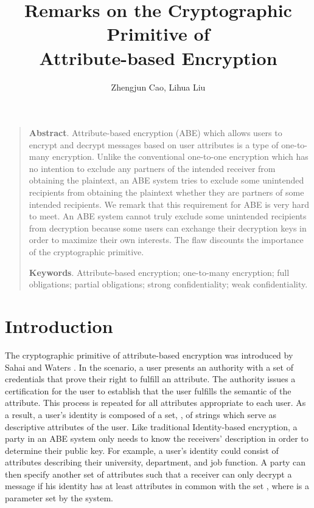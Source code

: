 \documentclass[11pt]{article}
\begin{document}
 \title{Remarks on the Cryptographic Primitive of\\ Attribute-based Encryption }

 \author{Zhengjun Cao, \qquad Lihua Liu}

\date{}
\maketitle

\begin{quotation}
 \textbf{Abstract}.   Attribute-based encryption (ABE) which allows users to
encrypt and decrypt messages based on user attributes is a type of one-to-many encryption.
Unlike the conventional one-to-one encryption which has no intention to exclude any partners of the intended receiver from obtaining the plaintext, an ABE system tries to exclude some unintended recipients from obtaining the plaintext whether they are partners of some intended recipients. We remark that this requirement for ABE is very hard to meet.  An ABE system  cannot truly exclude some unintended recipients from decryption because some users can exchange their decryption keys  in order to maximize their own interests.  The flaw discounts the importance of the cryptographic primitive.

 \textbf{Keywords}.  Attribute-based encryption; one-to-many encryption; full obligations; partial obligations;  strong confidentiality; weak confidentiality.
 \end{quotation}

\section{Introduction}
The cryptographic primitive of attribute-based encryption was introduced by Sahai and Waters \cite{SW05}.
 In the scenario, a user presents an authority with a set of credentials
that prove their right to fulfill an attribute. The authority issues a certification for the user to establish that the
user fulfills the semantic of the attribute.
This process is repeated for all attributes appropriate to
each user.  As a result, a user's identity is composed
of a set, , of strings which serve as descriptive attributes
of the user. Like traditional Identity-based encryption, a
party in an ABE system only needs to know the receivers' description in order to determine their
public key.
 For example, a user's identity could
consist of attributes describing their university, department,
and job function. A party  can then specify
another set of attributes  such that a receiver can only
decrypt a message if his identity  has at least  attributes
in common with the set , where  is a parameter set by
the system.
\end{document}
